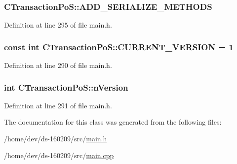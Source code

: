 \subsubsection[{A\+D\+D\+\_\+\+S\+E\+R\+I\+A\+L\+I\+Z\+E\+\_\+\+M\+E\+T\+H\+O\+D\+S}]{\setlength{\rightskip}{0pt plus 5cm}C\+Transaction\+Po\+S\+::\+A\+D\+D\+\_\+\+S\+E\+R\+I\+A\+L\+I\+Z\+E\+\_\+\+M\+E\+T\+H\+O\+D\+S}\label{class_c_transaction_po_s_af4a5ad634f661478e69ac1fbbde4c739}


Definition at line 295 of file main.\+h.

\hypertarget{class_c_transaction_po_s_ae34ce39804c212f9db35316f1792a0c2}{}
\subsubsection[{C\+U\+R\+R\+E\+N\+T\+\_\+\+V\+E\+R\+S\+I\+O\+N}]{\setlength{\rightskip}{0pt plus 5cm}const int C\+Transaction\+Po\+S\+::\+C\+U\+R\+R\+E\+N\+T\+\_\+\+V\+E\+R\+S\+I\+O\+N = 1\hspace{0.3cm}{\ttfamily [static]}}\label{class_c_transaction_po_s_ae34ce39804c212f9db35316f1792a0c2}


Definition at line 290 of file main.\+h.

\hypertarget{class_c_transaction_po_s_ae7bcf394bd58ec57e762934da2f13d52}{}
\subsubsection[{n\+Version}]{\setlength{\rightskip}{0pt plus 5cm}int C\+Transaction\+Po\+S\+::n\+Version}\label{class_c_transaction_po_s_ae7bcf394bd58ec57e762934da2f13d52}


Definition at line 291 of file main.\+h.



The documentation for this class was generated from the following files\+:\begin{DoxyCompactItemize}
\item 
/home/dev/ds-\/160209/src/\hyperlink{main_8h}{main.\+h}\item 
/home/dev/ds-\/160209/src/\hyperlink{main_8cpp}{main.\+cpp}\end{DoxyCompactItemize}

